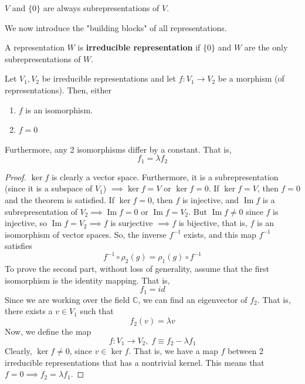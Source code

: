 \documentclass{article}
\DeclareMathOperator{\im}{Im}
\begin{document}
  \begin{example}
    $V$ and $\{0\}$ are always subrepresentations of $V$. 
  \end{example}

  We now introduce the "building blocks" of all representations. 
  \begin{definition}
    A representation $W$ is \textbf{irreducible representation} if $\{0\}$ and $W$ are the only subrepresentations of $W$. 
  \end{definition}

  \begin{lemma}
    Let $V_1, V_2$ be irreducible representations and let $f: V_1 \longrightarrow V_2$ be a morphism (of representations). Then, either
    \begin{enumerate}
      \item $f$ is an isomorphism. 
      \item $f = 0$
    \end{enumerate}
    Furthermore, any 2 isomorphisms differ by a constant. That is, 
    \begin{equation}
      f_1 = \lambda f_2
    \end{equation}
  \end{lemma}
  \begin{proof}
    $\ker{f}$ is clearly a vector space. Furthermore, it is a subrepresentation (since it is a subspace of $V_1$) $\implies \ker{f} = V$ or $\ker{f} = 0$. If $\ker{f} = V$, then $f = 0$ and the theorem is satisfied. If $\ker{f} = 0$, then $f$ is injective, and $\im{f}$ is a subrepresentation of $V_2 \implies \im{f} = 0$ or $\im{f} = V_2$. But $\im{f} \neq 0$ since $f$ is injective, so $\im{f} = V_2 \implies f$ is surjective $\implies f$ is bijective, that is, $f$ is an isomorphism of vector spaces. So, the inverse $f^{-1}$ exists, and this map $f^{-1}$ satisfies
    \begin{equation}
      f^{-1} \circ \rho_2(g) = \rho_1 (g) \circ f^{-1}
    \end{equation}
    To prove the second part, without loss of generality, assume that the first isomorphism is the identity mapping. That is, 
    \begin{equation}
      f_1 = id
    \end{equation}
    Since we are working over the field $\mathbb{C}$, we can find an eigenvector of $f_2$. That is, there exists a $v \in V_1$ such that 
    \begin{equation}
      f_2 (v) = \lambda v
    \end{equation}
    Now, we define the map
    \begin{equation}
      f: V_1 \longrightarrow V_2, \; f \equiv f_2 - \lambda f_1
    \end{equation}
    Clearly, $\ker{f} \neq 0$, since $v \in \ker{f}$. That is, we have a map $f$ between 2 irreducible representations that has a nontrivial kernel. This means that $f = 0 \implies f_2 = \lambda f_1$.  
  \end{proof}
\end{document}
